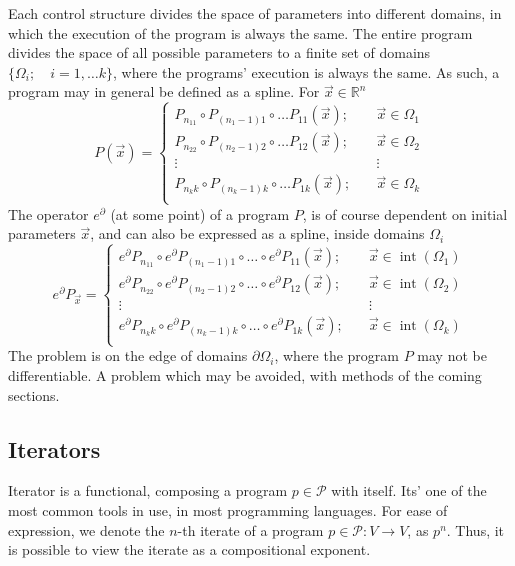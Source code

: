 \documentclass{article}
\newcommand{\RR}{\mathbb{R}}
\newcommand{\dP}{\mathcal{P}}
\newcommand{\D}{\partial}
\DeclareMathOperator{\interior}{int}
\begin{document}
 Each control structure divides the space of parameters into different domains, in which the execution of the program is always the same. The entire program divides the space of all possible parameters to a finite set of domains $\{\Omega_i;\quad i=1,\ldots
  k\}$, where the programs' execution is always the same. As such, a program may in general be defined as a spline. For $\vec{x}\in\RR^n$
 \begin{equation}
   \label{eq:zlrprk_splosno}
   P(\vec{x}) =
   \begin{cases}
     P_{n_11}\circ P_{(n_1-1)1}\circ\ldots P_{11}(\vec{x});&\quad \vec{x}\in\Omega_1\\
     P_{n_22}\circ P_{(n_2-1)2}\circ\ldots P_{12}(\vec{x});&\quad \vec{x}\in\Omega_2\\
     \vdots&\quad\vdots\\
     P_{n_kk}\circ P_{(n_k-1)k}\circ\ldots P_{1k}(\vec{x});&\quad \vec{x}\in\Omega_k\\
   \end{cases}
 \end{equation}
 The operator $e^\D$ (at some point) of a program $P$, is of course dependent on initial parameters $\vec{x}$, and can also be expressed as a spline, inside domains $\Omega_i$
 \begin{equation}
   \label{eq:Dzlrprk_splosno}
   e^\D P_{\vec{x}} =
   \begin{cases}
     e^\D P_{n_11}\circ e^\D P_{(n_1-1)1}\circ\ldots\circ e^\D P_{11}(\vec{x});&\quad \vec{x}\in\interior(\Omega_1)\\
     e^\D P_{n_22}\circ e^\D P_{(n_2-1)2}\circ\ldots\circ e^\D P_{12}(\vec{x});&\quad \vec{x}\in\interior(\Omega_2)\\
     \vdots&\quad\vdots\\
     e^\D P_{n_kk}\circ e^\D P_{(n_k-1)k}\circ\ldots\circ e^\D P_{1k}(\vec{x});&\quad \vec{x}\in\interior(\Omega_k)\\
   \end{cases}
 \end{equation}
 The problem is on the edge of domains $\partial\Omega_i$, where the program $P$ may not be differentiable. A problem which may be avoided, with methods of the coming sections.
 
  \subsection{Iterators}
  
  Iterator is a functional, composing a program $p\in\dP$ with itself. Its' one of the most common tools in use, in most programming languages. For ease of expression, we denote the $n$-th iterate of a program $p\in\dP:V\to V$, as $p^n$. Thus, it is possible to view the iterate as a compositional exponent.
  
\end{document}
